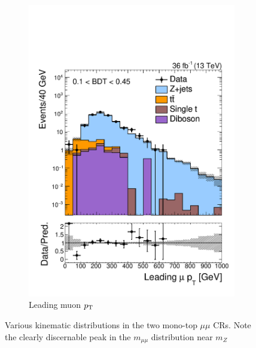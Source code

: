 \begin{figure}[]
\begin{center}
\begin{subfigure}[t]{0.49\textwidth}
            \includegraphics[width=\textwidth]{figures/monotop/prefit/dimuon_loose_looseLep1Pt_logy.pdf}
            \caption{Leading muon $p_\mathrm{T}$}
        \end{subfigure}
        \caption{Various kinematic distributions in the two mono-top $\mu\mu$ CRs. 
                Note the clearly discernable peak in the $m_{\mu\mu}$ distribution near $m_Z$}
        \label{fig:mt:prefit_dimuon}
    \end{center}
\end{figure}

